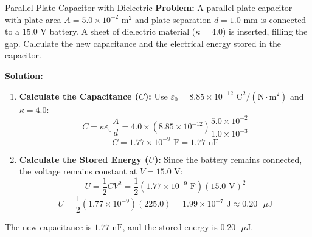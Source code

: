 \vspace{15pt}

\begin{examplebox}{Parallel-Plate Capacitor with Dielectric}
\textbf{Problem:} A parallel-plate capacitor with plate area $A = 5.0 \times 10^{-2}\text{ m}^2$ and plate separation $d = 1.0\text{ mm}$ is connected to a $15.0\text{ V}$ battery. A sheet of dielectric material ($\kappa = 4.0$) is inserted, filling the gap. Calculate the new capacitance and the electrical energy stored in the capacitor.

\vspace{0.8em}
\textbf{Solution:}
\begin{enumerate}
    \item \textbf{Calculate the Capacitance ($C$):}
    Use $\varepsilon_0 = 8.85 \times 10^{-12}\text{ C}^2/(\text{N}\cdot\text{m}^2)$ and $\kappa = 4.0$:
    \[ C = \kappa \varepsilon_0 \frac{A}{d} = 4.0 \times \left(8.85 \times 10^{-12}\right) \frac{5.0 \times 10^{-2}}{1.0 \times 10^{-3}} \]
    \[ C = 1.77 \times 10^{-9}\text{ F} = 1.77\text{ nF} \]
    
    \item \textbf{Calculate the Stored Energy ($U$):}
    Since the battery remains connected, the voltage remains constant at $V = 15.0\text{ V}$:
    \[ U = \frac{1}{2} C V^2 = \frac{1}{2} \left(1.77 \times 10^{-9}\text{ F}\right) (15.0\text{ V})^2 \]
    \[ U = \frac{1}{2} \left(1.77 \times 10^{-9}\right) (225.0) = 1.99 \times 10^{-7}\text{ J} \approx 0.20\text{ }\mu\text{J} \]
\end{enumerate}
The new capacitance is $1.77\text{ nF}$, and the stored energy is $0.20\text{ }\mu\text{J}$.
\end{examplebox}
